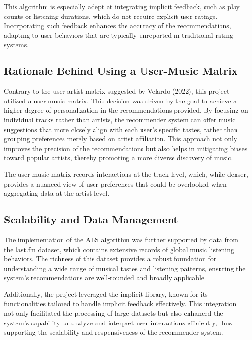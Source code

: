 \documentclass[10pt,twocolumn]{article}
\begin{document}
This algorithm is especially adept at integrating implicit feedback, such as play counts or listening durations, which do not require explicit user ratings. Incorporating such feedback enhances the accuracy of the recommendations, adapting to user behaviors that are typically unreported in traditional rating systems.

\subsection{Rationale Behind Using a User-Music Matrix}

Contrary to the user-artist matrix suggested by Velardo (2022), this project utilized a user-music matrix. This decision was driven by the goal to achieve a higher degree of personalization in the recommendations provided. By focusing on individual tracks rather than artists, the recommender system can offer music suggestions that more closely align with each user's specific tastes, rather than grouping preferences merely based on artist affiliation. This approach not only improves the precision of the recommendations but also helps in mitigating biases toward popular artists, thereby promoting a more diverse discovery of music.

The user-music matrix records interactions at the track level, which, while denser, provides a nuanced view of user preferences that could be overlooked when aggregating data at the artist level.

\subsection{Scalability and Data Management}

The implementation of the ALS algorithm was further supported by data from the last.fm dataset, which contains extensive records of global music listening behaviors. The richness of this dataset provides a robust foundation for understanding a wide range of musical tastes and listening patterns, ensuring the system's recommendations are well-rounded and broadly applicable.

Additionally, the project leveraged the implicit library, known for its functionalities tailored to handle implicit feedback effectively. This integration not only facilitated the processing of large datasets but also enhanced the system's capability to analyze and interpret user interactions efficiently, thus supporting the scalability and responsiveness of the recommender system.
\end{document}
